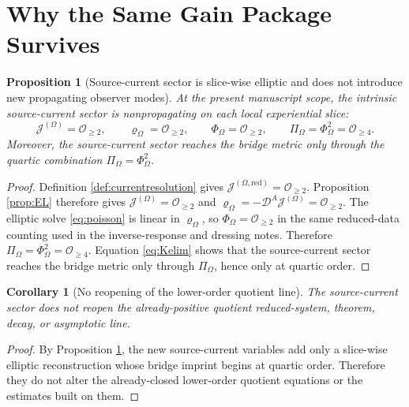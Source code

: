 \documentclass[11pt]{article}
\newcommand{\SpatialD}{\mathcal D}
\newcommand{\FlowPot}{\Phi_\Omega}
\newcommand{\BalanceField}{\Pi_\Omega}
\newcommand{\SourceDensity}{\varrho_\Omega}
\newcommand{\SourceCurrent}{\mathcal J^{(\Omega)}}
\newcommand{\SourceCurrentRed}{\mathcal J^{(\Omega,\mathrm{red})}}
\newtheorem{proposition}{Proposition}
\newtheorem{corollary}{Corollary}
\begin{document}
\section{Why the Same Gain Package Survives}

\begin{proposition}[Source-current sector is slice-wise elliptic and does not introduce new propagating observer modes]
\label{prop:elliptic}
At the present manuscript scope, the intrinsic source-current sector is nonpropagating on each local experiential slice:
\begin{equation}
\SourceCurrent=\mathcal O_{\ge 2},
\qquad
\SourceDensity=\mathcal O_{\ge 2},
\qquad
\FlowPot=\mathcal O_{\ge 2},
\qquad
\BalanceField=\FlowPot^2=\mathcal O_{\ge 4}.
\label{eq:orders}
\end{equation}
Moreover, the source-current sector reaches the bridge metric only through the quartic combination \(\BalanceField=\FlowPot^2\).
\end{proposition}

\begin{proof}
Definition \ref{def:currentresolution} gives \(\SourceCurrentRed=\mathcal O_{\ge 2}\). Proposition \ref{prop:EL} therefore gives \(\SourceCurrent=\mathcal O_{\ge 2}\) and \(\SourceDensity=-\SpatialD^A\SourceCurrent=\mathcal O_{\ge 2}\). The elliptic solve \eqref{eq:poisson} is linear in \(\SourceDensity\), so \(\FlowPot=\mathcal O_{\ge 2}\) in the same reduced-data counting used in the inverse-response and dressing notes. Therefore \(\BalanceField=\FlowPot^2=\mathcal O_{\ge 4}\). Equation \eqref{eq:Kelim} shows that the source-current sector reaches the bridge metric only through \(\BalanceField\), hence only at quartic order.
\end{proof}

\begin{corollary}[No reopening of the lower-order quotient line]
\label{cor:nopde}
The source-current sector does not reopen the already-positive quotient reduced-system, theorem, decay, or asymptotic line.
\end{corollary}

\begin{proof}
By Proposition \ref{prop:elliptic}, the new source-current variables add only a slice-wise elliptic reconstruction whose bridge imprint begins at quartic order. Therefore they do not alter the already-closed lower-order quotient equations or the estimates built on them.
\end{proof}
\end{document}
